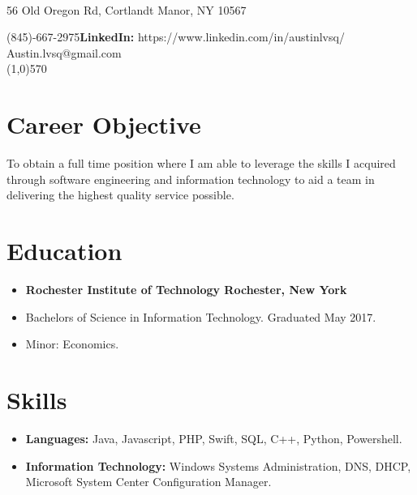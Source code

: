 \documentclass[10pt]{Article}
\begin{document}
\begin{center}
\\
\vspace{.5ex}
56 Old Oregon Rd, Cortlandt Manor, NY 10567
\end{center}
 (845)-667-2975\hfill{\bf LinkedIn:} https://www.linkedin.com/in/austinlvsq/\\
 Austin.lvsq@gmail.com\\
\line(1,0){570}
\section*{Career Objective}
To obtain a full time position where I am able to leverage the skills I acquired through software engineering and information technology to aid a team in delivering the highest quality service possible.

\section*{Education}
\begin{itemize}[topsep=1ex, itemsep=.5ex, parsep=0ex, partopsep=.75ex]
	\item[]{{\bf Rochester Institute of Technology \hfill Rochester, New York}}
  \item[] Bachelors of Science in Information Technology. \hfill Graduated May 2017.
  \item[] Minor: Economics.
\end{itemize}

\section*{Skills}
\begin{itemize}[topsep=1ex, itemsep=.5ex, parsep=0ex, partopsep=.75ex]
	\item[] {\bf Languages:} Java, Javascript, PHP, Swift, SQL, C++, Python, Powershell.
	\item[] {\bf Information Technology:} Windows Systems Administration, DNS, DHCP, Microsoft System Center Configuration Manager.
\end{itemize}
\end{document}
